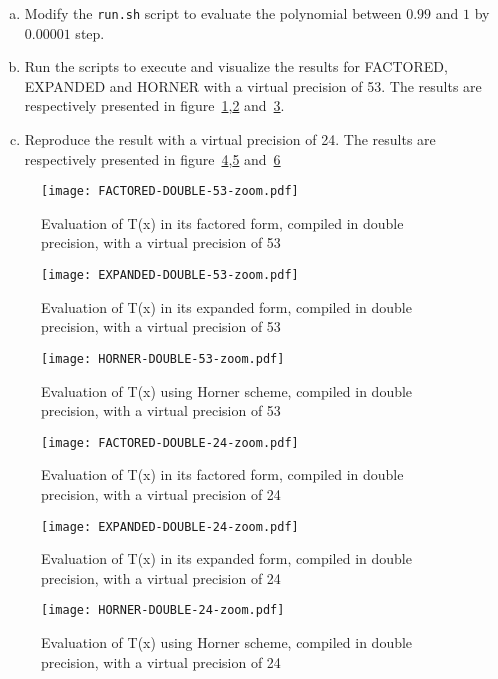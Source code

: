 \begin{question}
  \begin{enumerate}[(a)]
    \item Modify the {\tt run.sh} script to evaluate the  polynomial between $0.99$ and $1$ by $0.00001$ step.
  \item Run the scripts to execute and visualize the results for
    FACTORED, EXPANDED and HORNER with a virtual precision of 53. The results are respectively presented in figure~\ref{fig:factored:double:53:zoom},\ref{fig:expanded:double:53:zoom}
    and~\ref{fig:horner:double:53:zoom}.

\item Reproduce the result with a virtual precision of 24. The results are respectively presented in figure~\ref{fig:factored:double:24:zoom},\ref{fig:expanded:double:24:zoom}
    and~\ref{fig:horner:double:24:zoom}

\end{enumerate}
\end{question}

\begin{figure}[h]
  \center \texttt{[image: FACTORED-DOUBLE-53-zoom.pdf]}
  \caption{Evaluation of T(x) in its factored form, compiled in double
    precision, with a virtual precision of 53}
  \label{fig:factored:double:53:zoom}
\end{figure}

\begin{figure}[h]
  \center \texttt{[image: EXPANDED-DOUBLE-53-zoom.pdf]}
  \caption{Evaluation of T(x) in its expanded form, compiled in double
    precision, with a virtual precision of 53}
  \label{fig:expanded:double:53:zoom}
\end{figure}

\begin{figure}[h]
  \center \texttt{[image: HORNER-DOUBLE-53-zoom.pdf]}
  \caption{Evaluation of T(x) using Horner scheme, compiled in double precision,
    with a virtual precision of 53}
  \label{fig:horner:double:53:zoom}
\end{figure}

\begin{figure}[h]
  \center \texttt{[image: FACTORED-DOUBLE-24-zoom.pdf]}
  \caption{Evaluation of T(x) in its factored form, compiled in double
    precision, with a virtual precision of 24}
  \label{fig:factored:double:24:zoom}
\end{figure}

\begin{figure}[h]
  \center \texttt{[image: EXPANDED-DOUBLE-24-zoom.pdf]}
  \caption{Evaluation of T(x) in its expanded form, compiled in double
    precision, with a virtual precision of 24}
  \label{fig:expanded:double:24:zoom}
\end{figure}

\begin{figure}[h]
  \center \texttt{[image: HORNER-DOUBLE-24-zoom.pdf]}
  \caption{Evaluation of T(x) using Horner scheme, compiled in double precision,
    with a virtual precision of 24}
    \label{fig:horner:double:24:zoom}
\end{figure}
